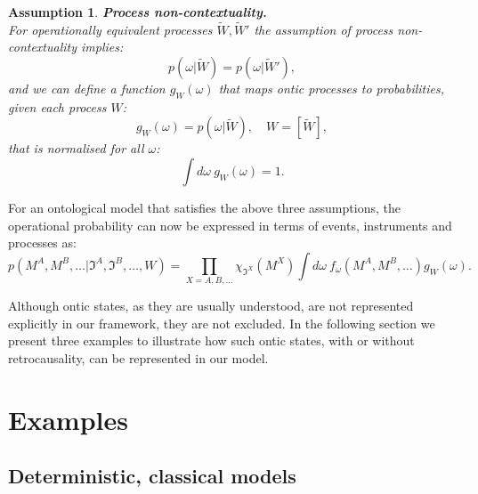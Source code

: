 \documentclass[a4paper,onecolumn,11pt,accepted=2018-05-04]{quantumarticle}
\newtheorem{assumption}{Assumption}
\begin{document}
\begin{assumption}
\textbf{Process non-contextuality.}
\\
For operationally equivalent processes $\tilde{W}, \tilde{W}'$ the assumption of process non-contextuality implies:
\begin{equation}
p(\omega|\tilde{W}) = p(\omega|\tilde{W}'),
\end{equation}
and we can define a function $g_W(\omega)$ that maps ontic processes to probabilities, given each process $W$:
\begin{equation}
g_W(\omega) = p(\omega|\tilde{W}),\quad W=\left[\tilde{W}\right],
\end{equation}
that is normalised for all $\omega$:
\begin{equation}
\int d \omega~g_W (\omega) = 1.
\end{equation}
\end{assumption}
For an ontological model that satisfies the above three assumptions, the operational probability can now be expressed in terms of events, instruments and processes as:
\begin{equation}
p(M^A, M^B,\dots|\mathfrak{I}^A, \mathfrak{I}^B,\dots, W) 
 = \prod_{X=A,B,\dots} \chi_{\mathfrak{I}^X}(M^X) \int d\omega~f_\omega(M^A, M^B, \dots) g_W(\omega).
\end{equation}

Although ontic states, as they are usually understood, are not represented explicitly in our framework, they are not excluded. In the following section we present three examples to illustrate how such ontic states, with or without retrocausality, can be represented in our model. 


\section{Examples}\label{examples}

\subsection{Deterministic, classical models}
\end{document}
